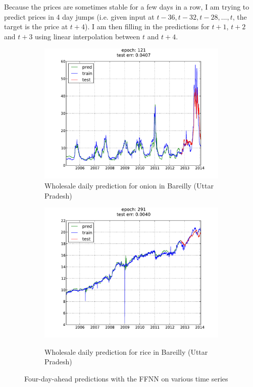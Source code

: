 Because the prices are sometimes stable for a few days in a row, I am trying to
predict prices in 4 day jumps (i.e. given input at $t-36, t-32, t-28, \dots,
t$, the target is the price at $t+4$). I am then filling in the predictions for
$t+1$, $t+2$ and $t+3$ using linear interpolation between $t$ and $t+4$.

\begin{figure}[H]
        \begin{subfigure}[b]{.45\linewidth}
        \centering
        \includegraphics[width=\textwidth]{img/ffnn/3.pdf}
        \caption{Wholesale daily prediction for onion in Bareilly (Uttar Pradesh)}
        \label{subfig:ffnn_pred_3}
        \end{subfigure}
        \quad
        \begin{subfigure}[b]{.45\linewidth}
        \centering
        \includegraphics[width=\textwidth]{img/ffnn/4.pdf}
        \label{subfig:ffnn_pred_4}
        \caption{Wholesale daily prediction for rice in Bareilly (Uttar Pradesh)}
        \end{subfigure}
    \caption{Four-day-ahead predictions with the FFNN on various time series}
\end{figure}

